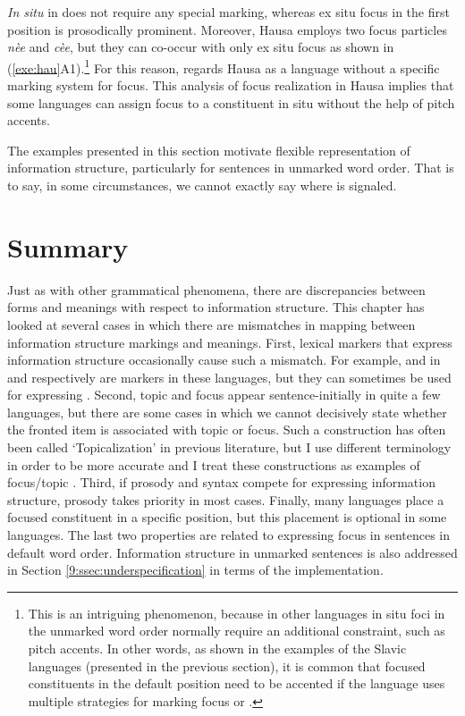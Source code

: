 \noindent \textit{In situ}  in  does not require any special
marking, whereas ex situ focus in the first position is
prosodically prominent. Moreover, Hausa employs two focus particles
\textit{n{\`e}e} and \textit{c{\`e}e}, but they can co-occur with only
ex situ focus as shown in (\ref{exe:hau}A1).\footnote{This is
  an intriguing phenomenon, because in other languages in
    situ foci in the unmarked word order normally require an
  additional constraint, such as pitch accents. In other words, as
  shown in the examples of the Slavic languages (presented in the
  previous section), it is common that focused constituents in the
  default position need to be accented if the language uses multiple
  strategies for marking focus or .} For this reason,
\citet{buring:10} regards Hausa as a language without a specific
marking system for focus. This analysis of focus realization in Hausa
implies that some languages can assign focus to a constituent
in situ without the help of pitch accents.


The examples presented in this section motivate flexible
representation of information structure, particularly for sentences in
unmarked word order.  That is to say, in some circumstances, we cannot
exactly say where  is signaled.


\section{Summary}
\label{5:sec:summary}

Just as with other grammatical phenomena, there are discrepancies
between forms and meanings with respect to information structure.
This chapter has looked at several cases in which there are mismatches
in mapping between information structure markings and
meanings. First, lexical markers that express
information structure occasionally cause such a mismatch. For example,
\wa and \nun in  and  respectively are
 markers in these languages, but they can sometimes be used
for expressing . Second, topic and focus appear
sentence-initially in quite a few languages, but there are some cases
in which we cannot decisively state whether the fronted item is
associated with topic or focus. Such a construction has often been
called `Topicalization' in previous literature, but I use different
terminology in order to be more accurate and I treat these
constructions as examples of focus/topic . Third, if
prosody and syntax compete for expressing information structure,
prosody takes priority in most cases. Finally, many languages place a
focused constituent in a specific position, but this placement is
optional in some languages.  The last two properties are related to
expressing focus in sentences in default word order. Information
structure in unmarked sentences is also addressed in
Section \ref{9:ssec:underspecification}  in
terms of the implementation.

